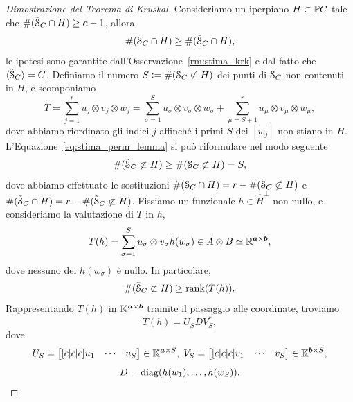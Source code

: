\begin{proof}[Dimostrazione del Teorema di Kruskal]
	Consideriamo un iperpiano $ H \subset \mathbb{P} C $
	tale che $ \#(\tilde{\mathcal{S}}_C \cap H) \ge \bm{c}-1 $, allora
	\begin{equation}
		\label{eq:stima_perm_lemma}
		\#(\mathcal{S}_C \cap H) \ge \#(\tilde{\mathcal{S}}_C \cap H) ,
	\end{equation}
	le ipotesi sono garantite dall'Osservazione~\ref{rm:stima_krk} e dal fatto che $
		\angb{\tilde{\s}_C} = C $.
	Definiamo il numero $ S \vcentcolon= \#(\mathcal{S}_C \not\subset H) $ dei punti di $ \mathcal{S}_C $ non contenuti in $ H
	$, e scomponiamo
	\[
		T = \sum_{j=1}^r u_j \otimes v_j \otimes w_j =
		\sum_{\sigma=1}^S u_\sigma \otimes v_\sigma \otimes w_\sigma + \sum_{\mu = S+1}^r u_\mu \otimes v_\mu \otimes w_\mu
		,\] dove abbiamo riordinato gli indici $ j $ affinché i primi $ S $ dei $ [w_j] $ non stiano in $
		H $. L'Equazione~\eqref{eq:stima_perm_lemma} si può riformulare nel modo seguente
	\begin{equation*}
		\#(\tilde{\mathcal{S}}_C \not\subset H) \ge  \#(\mathcal{S}_C \not\subset H) = S,
	\end{equation*}
	dove abbiamo effettuato le sostituzioni $ \#(\mathcal{S}_C \cap H) = r - \#(\mathcal{S}_C \not\subset H) $ e $  \#(\tilde{\mathcal{S}}_C
		\cap H) = r - \#(\tilde{\mathcal{S}}_C \not\subset H) $. Fissiamo un funzionale $ h \in \hat{H}^\perp $
	non nullo, e consideriamo la valutazione di $ T $ in $ h $,
	\begin{equation*}
		T(h) = \sum_{\sigma=1}^S u_\sigma \otimes v_\sigma  h(w_\sigma) \in A \otimes B \simeq \mathbb{R}^{\bm{a} \times \bm{b}},
	\end{equation*}
	dove nessuno dei $ h(w_\sigma)
	$ è nullo. In particolare,
	\begin{equation*}
		\#(\tilde{\mathcal{S}}_C \not\subset H) \ge \operatorname{rank}(T(h)).
	\end{equation*}
	Rappresentando $ T(h) $ in $ \mathbb{K}^{\bm{a}\times \bm{b}} $ tramite il passaggio alle
	coordinate, troviamo
	\begin{equation*}
		T(h) = U_{S}DV^{*}_{S},
	\end{equation*}
	dove
	\begin{equation*}
		U_{S} = \begin{bmatrix}[c|c|c] u_1 & \cdots & u_{S}  \end{bmatrix} \in \mathbb{K}^{\bm{a}\times S}  , \;
		V_{S} = \begin{bmatrix}[c|c|c] v_1
			 & \cdots & v_{S}\end{bmatrix} \in \mathbb{K}^{\bm{b}\times S},
	\end{equation*}
	\begin{equation*}
		D = \diag(h(w_1), \ldots, h(w_{S})).

\end{equation*}
\end{proof}
